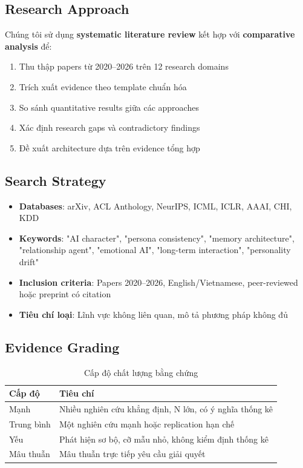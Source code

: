 \documentclass[10pt,leqno]{amsart}
\begin{document}
\subsection{Research Approach}

Chúng tôi sử dụng \textbf{systematic literature review} kết hợp với \textbf{comparative analysis} để:
\begin{enumerate}
    \item Thu thập papers từ 2020--2026 trên 12 research domains
    \item Trích xuất evidence theo template chuẩn hóa
    \item So sánh quantitative results giữa các approaches
    \item Xác định research gaps và contradictory findings
    \item Đề xuất architecture dựa trên evidence tổng hợp
\end{enumerate}

\subsection{Search Strategy}
\begin{itemize}
    \item \textbf{Databases}: arXiv, ACL Anthology, NeurIPS, ICML, ICLR, AAAI, CHI, KDD
    \item \textbf{Keywords}: "AI character", "persona consistency", "memory architecture", "relationship agent", "emotional AI", "long-term interaction", "personality drift"
    \item \textbf{Inclusion criteria}: Papers 2020--2026, English/Vietnamese, peer-reviewed hoặc preprint có citation
    \item \textbf{Tiêu chí loại}: Lĩnh vực không liên quan, mô tả phương pháp không đủ
\end{itemize}

\subsection{Evidence Grading}

\begin{table}[H]
\centering
\caption{Cấp độ chất lượng bằng chứng}
\label{tab:evidence-quality}
\begin{tabular}{ll}
\toprule
\textbf{Cấp độ} & \textbf{Tiêu chí} \\
\midrule
Mạnh & Nhiều nghiên cứu khẳng định, N lớn, có ý nghĩa thống kê \\
Trung bình & Một nghiên cứu mạnh hoặc replication hạn chế \\
Yếu & Phát hiện sơ bộ, cỡ mẫu nhỏ, không kiểm định thống kê \\
Mâu thuẫn & Mâu thuẫn trực tiếp yêu cầu giải quyết \\
\bottomrule
\end{tabular}
\end{table}
\end{document}
